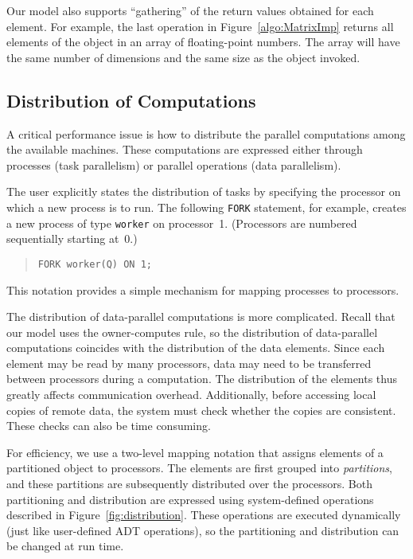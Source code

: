 \documentclass{acmtrans2e}
\begin{document}
Our model also supports ``gathering'' of the return values obtained
for each element. For example, the last operation in
Figure~\ref{algo:MatrixImp} returns
all elements of the object in an array of floating-point numbers. 
The array will have the same number of dimensions and the same size as the
object invoked. 

\subsection{Distribution of Computations}

A critical performance issue is how to distribute the parallel
computations among the available machines. These computations are
expressed either through processes (task parallelism) or parallel
operations (data parallelism).

The user explicitly states the distribution of tasks by specifying the
processor on which a new process is to run. The following \verb+FORK+
statement, for example, creates a new process of type \verb+worker+ on
processor~1. (Processors are numbered sequentially starting at~0.)

\begin{quote}
\begin{verbatim}
FORK worker(Q) ON 1;
\end{verbatim}
\end{quote}
This notation provides a simple mechanism for mapping processes to
processors.

The distribution of data-parallel computations is more complicated.
Recall that our model uses the owner-computes rule, so the
distribution of data-parallel computations coincides with the
distribution of the data elements. Since each element may be read by
many processors, data may need to be transferred between processors
during a computation. The distribution of the elements thus greatly
affects communication overhead. Additionally, before accessing local copies
of remote data, the system must check whether the copies are
consistent. These checks can also be time consuming.

For efficiency, we use a two-level mapping notation that assigns
elements of a partitioned object to processors. The elements are first
grouped into {\em partitions}, and these partitions are subsequently
distributed over the processors.
Both partitioning and
distribution are expressed using system-defined operations described
in Figure~\ref{fig:distribution}. These operations are executed
dynamically (just like user-defined ADT operations), so the
partitioning and distribution can be changed at run time.
\end{document}
